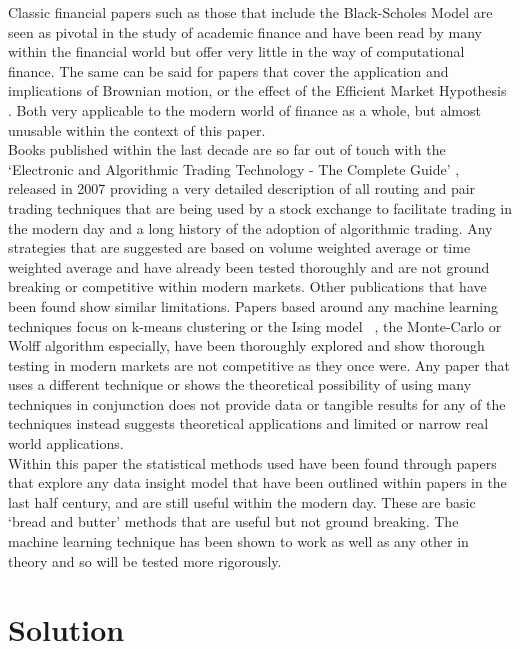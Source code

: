 \documentclass[12pt,a4paper]{article}
\begin{document}
Classic financial papers such as those that include the Black-Scholes Model \cite{Saad} are seen as pivotal in the study of academic finance and have been read by many within the financial world but offer very little in the way of computational finance. The same can be said for papers that cover the application and implications of Brownian motion, or the effect of the Efficient Market Hypothesis \cite{Meng}. Both very applicable to the modern world of finance as a whole, but almost unusable within the context of this paper. \\

Books published within the last decade are so far out of touch with the `Electronic and Algorithmic Trading Technology - The Complete Guide' \cite{Kim}, released in 2007 providing a very detailed description of all routing and pair trading techniques that are being used by a stock exchange to facilitate trading in the modern day and a long history of the adoption of algorithmic trading. Any strategies that are suggested are based on volume weighted average or time weighted average and have already been tested thoroughly and are not ground breaking or competitive within modern markets. Other publications that have been found show similar limitations. Papers based around any machine learning techniques focus on k-means clustering \cite{Gerlein} or the Ising model \ \cite{Lima}, the Monte-Carlo or Wolff algorithm especially, have been thoroughly explored and show thorough testing in modern markets are not competitive as they once were. Any paper that uses a different technique or shows the theoretical possibility of using many techniques in conjunction does not provide data or tangible results for any of the techniques instead suggests theoretical applications and limited or narrow real world applications.\\

Within this paper the statistical methods used have been found through papers that explore any data insight model that have been outlined within papers in the last half century, and are still useful within the modern day. These are basic `bread and butter' methods that are useful but not ground breaking. The machine learning technique has been shown to work as well as any other in theory and so will be tested more rigorously.\\

\iffalse
#################################################################################
\fi

\section{Solution}
\end{document}

